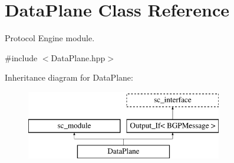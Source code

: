 \hypertarget{classDataPlane}{\section{Data\-Plane Class Reference}
\label{classDataPlane}
}


Protocol Engine module.  




{\ttfamily \#include $<$Data\-Plane.\-hpp$>$}

Inheritance diagram for Data\-Plane\-:\begin{figure}[H]
\begin{center}
\leavevmode
\includegraphics[height=3.000000cm]{classDataPlane}
\end{center}
\end{figure}
